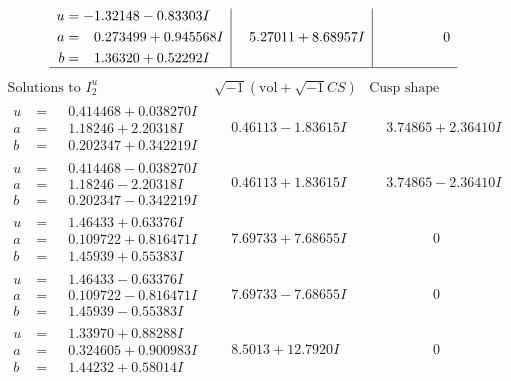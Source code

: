 \documentclass[1p]{elsarticle_modified}
\theoremstyle{definition}
\newcommand{\I}{\sqrt{-1}}
\begin{document}
$$\begin{array}{c|c|c}
\begin{aligned}
u &= -1.32148 - 0.83303 I \\
a &= \phantom{-}0.273499 + 0.945568 I \\
b &= \phantom{-}1.36320 + 0.52292 I\end{aligned}
 & \phantom{-}5.27011 + 8.68957 I & \phantom{-0.000000 } 0\\
 \hline 
 \end{array}$$\newpage$$\begin{array}{c|c|c}  
\text{Solutions to }I^u_{2}& \I (\text{vol} + \sqrt{-1}CS) & \text{Cusp shape}\\
 \hline 
\begin{aligned}
u &= \phantom{-}0.414468 + 0.038270 I \\
a &= \phantom{-}1.18246 + 2.20318 I \\
b &= \phantom{-}0.202347 + 0.342219 I\end{aligned}
 & \phantom{-}0.46113 - 1.83615 I & \phantom{-}3.74865 + 2.36410 I \\ \hline\begin{aligned}
u &= \phantom{-}0.414468 - 0.038270 I \\
a &= \phantom{-}1.18246 - 2.20318 I \\
b &= \phantom{-}0.202347 - 0.342219 I\end{aligned}
 & \phantom{-}0.46113 + 1.83615 I & \phantom{-}3.74865 - 2.36410 I \\ \hline\begin{aligned}
u &= \phantom{-}1.46433 + 0.63376 I \\
a &= \phantom{-}0.109722 + 0.816471 I \\
b &= \phantom{-}1.45939 + 0.55383 I\end{aligned}
 & \phantom{-}7.69733 + 7.68655 I & \phantom{-0.000000 } 0 \\ \hline\begin{aligned}
u &= \phantom{-}1.46433 - 0.63376 I \\
a &= \phantom{-}0.109722 - 0.816471 I \\
b &= \phantom{-}1.45939 - 0.55383 I\end{aligned}
 & \phantom{-}7.69733 - 7.68655 I & \phantom{-0.000000 } 0 \\ \hline\begin{aligned}
u &= \phantom{-}1.33970 + 0.88288 I \\
a &= \phantom{-}0.324605 + 0.900983 I \\
b &= \phantom{-}1.44232 + 0.58014 I\end{aligned}
 & \phantom{-}8.5013 + 12.7920 I & \phantom{-0.000000 } 0 \\ \hline\begin{aligned}

\end{aligned}
\end{array}$$
\end{document}

